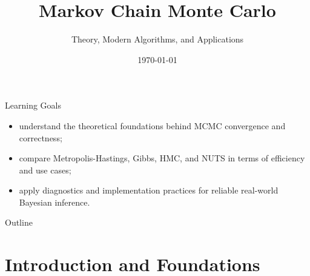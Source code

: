 \documentclass[aspectratio=169,11pt]{beamer}
\title[Advanced MCMC]{Markov Chain Monte Carlo}
\subtitle{Theory, Modern Algorithms, and Applications}
\date{\today}
\begin{document}
\begin{frame}
\titlepage
\end{frame}

\begin{frame}{Learning Goals}
\begin{itemize}
\item understand the theoretical foundations behind MCMC convergence and correctness;
\item compare Metropolis-Hastings, Gibbs, HMC, and NUTS in terms of efficiency and use cases;
\item apply diagnostics and implementation practices for reliable real-world Bayesian inference.
\end{itemize}
\end{frame}

\begin{frame}{Outline}
\tableofcontents
\end{frame}

\section{Introduction and Foundations}
\end{document}
